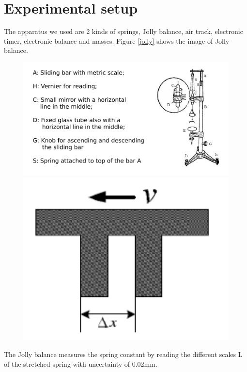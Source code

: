 \documentclass[11pt,a4paper]{article}
\begin{document}
\section{Experimental setup}
\qquad The apparatus we used are 2 kinds of springs, Jolly balance, air track, electronic timer, electronic
balance and masses. Figure \ref{jolly} shows the image of Jolly balance.
\begin{figure}[h] 
    \begin{minipage}[t]{0.5\linewidth} 
        \centering 
        \includegraphics[scale=0.4]{jolly.png} 
        \caption{} 
        \label{jolly}
    \end{minipage} 
    \begin{minipage}[t]{0.5\linewidth}  
        \centering
        \includegraphics[scale=0.8]{U-shape.png} 
        \caption{}
        \label{ushape}
    \end{minipage} 
\end{figure}
 \newpage
 The Jolly balance measures the spring constant by reading the different scales L of the stretched spring with uncertainty of 0.02mm. \par
\end{document}
